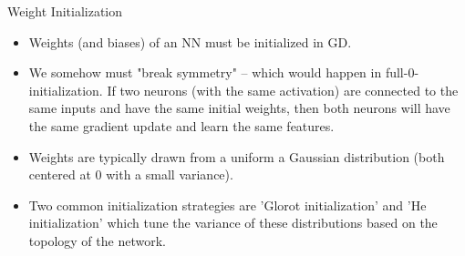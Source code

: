 \begin{vbframe}{Weight Initialization}
\begin{itemize}
\item Weights (and biases) of an NN must be initialized in GD.
\item We somehow must "break symmetry" -- which would happen in full-0-initialization.
    If two neurons (with the same activation) are connected to the same inputs and have the same initial weights, then both neurons will have the same gradient update and learn the same features.
\item Weights are typically drawn from a uniform a Gaussian distribution (both centered at 0 with a small variance).
\item Two common initialization strategies are ’Glorot initialization’ and ’He initialization’ which tune the variance of these distributions based on the topology of the network.
\end{itemize}
\end{vbframe}



